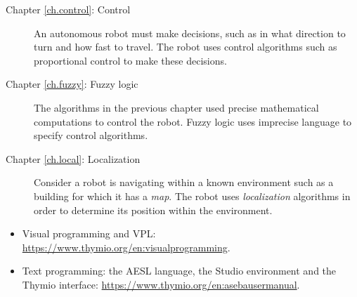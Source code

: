 \begin{description}
\item[Chapter \ref{ch.control}: Control] An autonomous
robot must make decisions, such as in what direction to turn and how
fast to travel. The robot uses control algorithms such as proportional
control to make these decisions.

\item[Chapter \ref{ch.fuzzy}: Fuzzy logic] The algorithms in the
previous chapter used precise mathematical computations to control the
robot. Fuzzy logic uses imprecise language to specify control
algorithms.

\item[Chapter \ref{ch.local}: Localization] Consider a robot is
navigating within a known environment such as a building for which it
has a \emph{map}. The robot uses \emph{localization} algorithms in order
to determine its position within the environment.

\end{description}




\begin{itemize}
\item Visual programming and VPL:
\href{https://www.thymio.org/en:visualprogramming}{https://www.thymio.org/en:visualprogramming}.

\item Text programming: the AESL language, the Studio environment and the Thymio interface:
\href{https://www.thymio.org/en:asebausermanual}{https://www.thymio.org/en:asebausermanual}.
\end{itemize}
